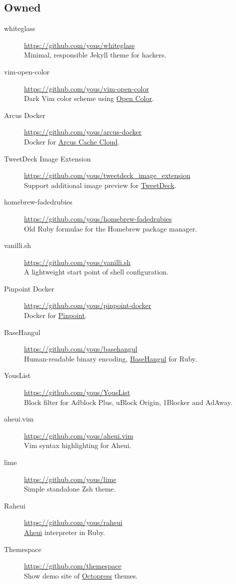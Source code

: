 \documentclass[a4paper,10pt]{article}
\begin{document}
\subsection{Owned}
\begin{description}
  \item[whiteglass] \url{https://github.com/yous/whiteglass} \\
    Minimal, responsible Jekyll theme for hackers.
  \item[vim-open-color] \url{https://github.com/yous/vim-open-color} \\
    Dark Vim color scheme using \href{https://yeun.github.io/open-color/}{Open Color}.
  \item[Arcus Docker] \url{https://github.com/yous/arcus-docker} \\
    Docker for \href{https://github.com/naver/arcus}{Arcus Cache Cloud}.
  \item[TweetDeck Image Extension] \url{https://github.com/yous/tweetdeck_image_extension} \\
    Support additional image preview for \href{https://tweetdeck.twitter.com}{TweetDeck}.
  \item[homebrew-fadedrubies] \url{https://github.com/yous/homebrew-fadedrubies} \\
    Old Ruby formulae for the Homebrew package manager.
  \item[vanilli.sh] \url{https://github.com/yous/vanilli.sh} \\
    A lightweight start point of shell configuration.
  \item[Pinpoint Docker] \url{https://github.com/yous/pinpoint-docker} \\
    Docker for \href{https://github.com/naver/pinpoint}{Pinpoint}.
  \item[BaseHangul] \url{https://github.com/yous/basehangul} \\
    Human-readable binary encoding, \href{https://basehangul.github.io}{BaseHangul} for Ruby.
  \item[YousList] \url{https://github.com/yous/YousList} \\
    Block filter for Adblock Plus, uBlock Origin, 1Blocker and AdAway.
  \item[aheui.vim] \url{https://github.com/yous/aheui.vim} \\
    Vim syntax highlighting for Aheui.
  \item[lime] \url{https://github.com/yous/lime} \\
    Simple standalone Zsh theme.
  \item[Raheui] \url{https://github.com/yous/raheui} \\
    \href{http://aheui.github.io}{Aheui} interpreter in Ruby.
  \item[Themespace] \url{https://github.com/themespace} \\
    Show demo site of \href{http://octopress.org}{Octopress} themes.
\end{description}
\end{document}
